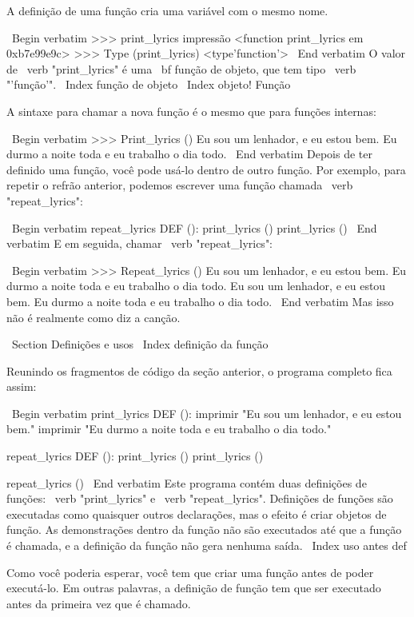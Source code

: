 \documentclass[10pt]{book}
\begin{document}
{A definição de uma função cria uma variável com o mesmo nome.

\ Begin {verbatim}
>>> print_lyrics impressão
<function print_lyrics em 0xb7e99e9c>
>>> Type (print_lyrics)
<type'function'>
\ End {verbatim}
%
O valor de \ verb "print_lyrics" é uma {\ bf função de objeto}, que
tem tipo \ verb "'função'".
\ Index {função de objeto}
\ Index {objeto! Função}

A sintaxe para chamar a nova função é o mesmo que
para funções internas:

\ Begin {verbatim}
>>> Print_lyrics ()
Eu sou um lenhador, e eu estou bem.
Eu durmo a noite toda e eu trabalho o dia todo.
\ End {verbatim}
%
Depois de ter definido uma função, você pode usá-lo dentro de outro
função. Por exemplo, para repetir o refrão anterior, podemos escrever
uma função chamada \ verb "repeat_lyrics":

\ Begin {verbatim}
repeat_lyrics DEF ():
    print_lyrics ()
    print_lyrics ()
\ End {verbatim}
%
E em seguida, chamar \ verb "repeat_lyrics":

\ Begin {verbatim}
>>> Repeat_lyrics ()
Eu sou um lenhador, e eu estou bem.
Eu durmo a noite toda e eu trabalho o dia todo.
Eu sou um lenhador, e eu estou bem.
Eu durmo a noite toda e eu trabalho o dia todo.
\ End {verbatim}
%
Mas isso não é realmente como diz a canção.


\ Section {Definições e usos}
\ Index {definição da função}

Reunindo os fragmentos de código da seção anterior, o
programa completo fica assim:

\ Begin {verbatim}
print_lyrics DEF ():
    imprimir "Eu sou um lenhador, e eu estou bem."
    imprimir "Eu durmo a noite toda e eu trabalho o dia todo."

repeat_lyrics DEF ():
    print_lyrics ()
    print_lyrics ()

repeat_lyrics ()
\ End {verbatim}
%
Este programa contém duas definições de funções: \ verb "print_lyrics" e
\ verb "repeat_lyrics". Definições de funções são executadas como quaisquer outros
declarações, mas o efeito é criar objetos de função. As demonstrações
dentro da função não são executados até que a função é chamada, e
a definição da função não gera nenhuma saída.
\ Index {uso antes def}

Como você poderia esperar, você tem que criar uma função antes de poder
executá-lo. Em outras palavras, a definição de função tem que ser
executado antes da primeira vez que é chamado.

}
\end{document}
